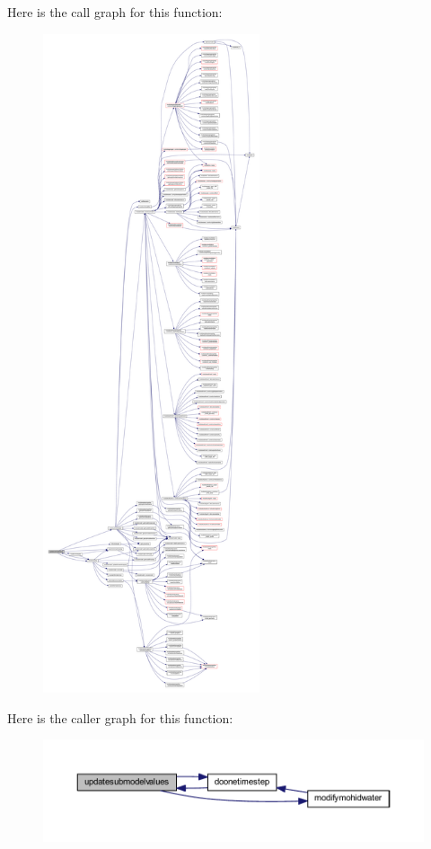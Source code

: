 Here is the call graph for this function\+:\nopagebreak
\begin{figure}[H]
\begin{center}
\leavevmode
\includegraphics[height=550pt]{_main_8_f90_a4c5ecbd810307fa557d4b4e6719c7fd1_cgraph}
\end{center}
\end{figure}
Here is the caller graph for this function\+:\nopagebreak
\begin{figure}[H]
\begin{center}
\leavevmode
\includegraphics[width=350pt]{_main_8_f90_a4c5ecbd810307fa557d4b4e6719c7fd1_icgraph}
\end{center}
\end{figure}
